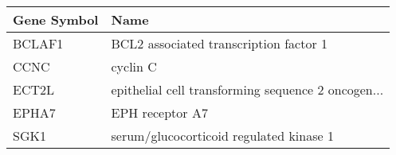 \begin{tabular}{ll}
\toprule
Gene Symbol &                                               Name \\
\midrule
     BCLAF1 &             BCL2 associated transcription factor 1 \\
       CCNC &                                           cyclin C \\
      ECT2L & epithelial cell transforming sequence 2 oncogen... \\
      EPHA7 &                                    EPH receptor A7 \\
       SGK1 &            serum/glucocorticoid regulated kinase 1 \\
\bottomrule
\end{tabular}
